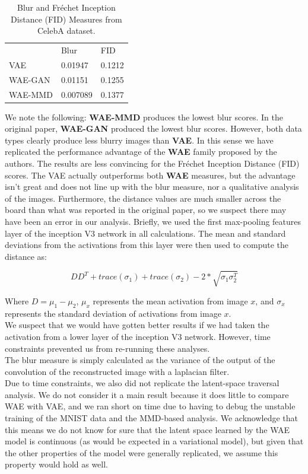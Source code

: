 \documentclass[12pt,english]{amsart}
\theoremstyle{definition}
\begin{document}
\begin{table}[]
\centering
\caption{Blur and Fr\'echet Inception Distance (FID) Measures from CelebA dataset.}
\label{Table 1}
\begin{tabular}{lll}
        & Blur     & FID    \\
VAE     & 0.01947  & 0.1212 \\
WAE-GAN & 0.01151  & 0.1255 \\
WAE-MMD & 0.007089 & 0.1377
\end{tabular}
\end{table}

We note the following: \textbf{WAE-MMD} produces the lowest blur scores. In the
original paper, \textbf{WAE-GAN} produced the lowest blur scores. However, both
data types clearly produce less blurry images than \textbf{VAE}. In this sense
we have replicated the performance advantage of the \textbf{WAE} family proposed
by the authors. The results are less convincing for the Fr\'echet Inception
Distance (FID) scores. The VAE actually outperforms both \textbf{WAE} measures,
but the advantage isn't great and does not line up with the blur measure, nor
a qualitative analysis of the images. Furthermore, the distance values are much
smaller across the board than what was reported in the original paper, so we
suspect there may have been an error in our analysis. Briefly, we used the first
max-pooling features layer of the inception V3 network in all calculations. The
mean and standard deviations from the activations from this layer were then
used to compute the distance as:

$$ D D^T + trace(\sigma_1) + trace(\sigma_2) - 2 * \sqrt{\sigma_1 \sigma_2^T} $$

Where $D = \mu_1 - \mu_2$, $\mu_x$ represents the mean activation from image $x$,
and $\sigma_x$ represents the standard deviation of activations from image $x$. \\

We suspect that we would have gotten better results if we had taken the activation
from a lower layer of the inception V3 network. However, time constraints prevented
us from re-running these analyses. \\

The blur measure is simply calculated as the variance of the output of the
convolution of the reconstructed image with a laplacian filter. \\

Due to time constraints, we also did not replicate the latent-space traversal
analysis. We do not consider it a main result because it does little to compare
WAE with VAE, and we ran short on time due to having to debug the unstable
training of the MNIST data and the MMD-based analysis. We acknowledge that this
means we do not know for sure that the latent space learned by the WAE model is
continuous (as would be expected in a variational model), but given that
the other properties of the model were generally replicated, we assume this
property would hold as well.
\end{document}
